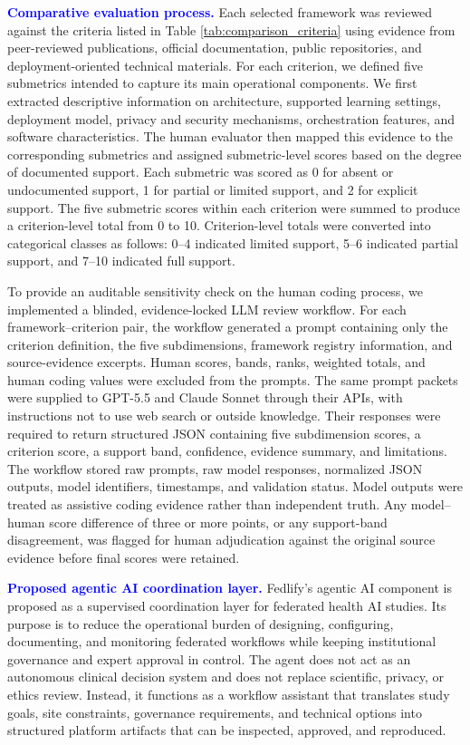 \documentclass[preprint,5p, 10pt, times]{elsarticle}
\begin{document}
\textcolor{blue}{\textbf{Comparative evaluation process.}}
Each selected framework was reviewed against the criteria listed in Table \ref{tab:comparison_criteria} using evidence from peer-reviewed publications, official documentation, public repositories, and deployment-oriented technical materials. 
For each criterion, we defined five submetrics intended to capture its main operational components.
We first extracted descriptive information on architecture, supported learning settings, deployment model, privacy and security mechanisms, orchestration features, and software characteristics. 
The human evaluator then mapped this evidence to the corresponding submetrics and assigned submetric-level scores based on the degree of documented support. 
Each submetric was scored as 0 for absent or undocumented support, 1 for partial or limited support, and 2 for explicit support. 
The five submetric scores within each criterion were summed to produce a criterion-level total from 0 to 10. 
Criterion-level totals were converted into categorical classes as follows: 0--4 indicated limited support, 5--6 indicated partial support, and 7--10 indicated full support.

To provide an auditable sensitivity check on the human coding process, we implemented a blinded, evidence-locked LLM review workflow. 
For each framework--criterion pair, the workflow generated a prompt containing only the criterion definition, the five subdimensions, framework registry information, and source-evidence excerpts. 
Human scores, bands, ranks, weighted totals, and human coding values were excluded from the prompts. 
The same prompt packets were supplied to GPT-5.5 and Claude Sonnet through their APIs, with instructions not to use web search or outside knowledge. 
Their responses were required to return structured JSON containing five subdimension scores, a criterion score, a support band, confidence, evidence summary, and limitations. 
The workflow stored raw prompts, raw model responses, normalized JSON outputs, model identifiers, timestamps, and validation status. 
Model outputs were treated as assistive coding evidence rather than independent truth. 
Any model--human score difference of three or more points, or any support-band disagreement, was flagged for human adjudication against the original source evidence before final scores were retained.

\textcolor{blue}{\textbf{Proposed agentic AI coordination layer.}}
Fedlify's agentic AI component is proposed as a supervised coordination layer for federated health AI studies. 
Its purpose is to reduce the operational burden of designing, configuring, documenting, and monitoring federated workflows while keeping institutional governance and expert approval in control. 
The agent does not act as an autonomous clinical decision system and does not replace scientific, privacy, or ethics review. 
Instead, it functions as a workflow assistant that translates study goals, site constraints, governance requirements, and technical options into structured platform artifacts that can be inspected, approved, and reproduced.
\end{document}

